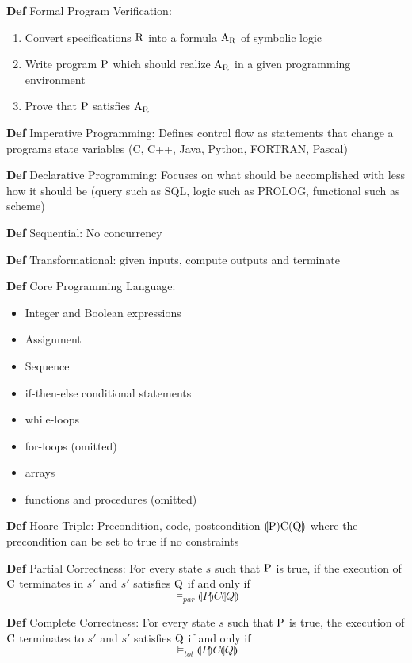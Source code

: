 \documentclass[11pt,notitlepage]{report}
\newcommand{\llp}[0]{\ensuremath{\llparenthesis}}
\newcommand{\rrp}[0]{\ensuremath{\rrparenthesis}}
\newcommand{\tbf}[1]{\textbf{#1}}
\begin{document}
\tbf{Def} Formal Program Verification:
\vspace{-3mm}
\begin{enumerate}
    \item Convert specifications $\rm R$ into a formula $\rm A_R$ of symbolic logic
    \item Write program $\rm P$ which should realize $\rm A_R$ in a given programming environment
    \item Prove that $\rm P$ satisfies $\rm A_R$
\end{enumerate}

\tbf{Def} Imperative Programming: Defines control flow as statements that change a programs state variables (C, C++, Java, Python, FORTRAN, Pascal)

\tbf{Def} Declarative Programming: Focuses on what should be accomplished with less how it should be (query such as SQL, logic such as PROLOG, functional such as scheme)

\tbf{Def} Sequential: No concurrency

\tbf{Def} Transformational: given inputs, compute outputs and terminate

\tbf{Def} Core Programming Language:
\vspace{-3mm}
\begin{itemize}
    \item Integer and Boolean expressions
    \item Assignment
    \item Sequence
    \item if-then-else conditional statements
    \item while-loops
    \item for-loops (omitted)
    \item arrays
    \item functions and procedures (omitted)
\end{itemize}

\tbf{Def} Hoare Triple: Precondition, code, postcondition $\rm \llp P\rrp C \llp Q\rrp$ where the precondition can be set to true if no constraints

\tbf{Def} Partial Correctness: For every state $s$ such that $\rm P$ is true, if the execution of $\rm C$ terminates in $s'$ and $s'$ satisfies $\rm Q$ if and only if
$$\vDash_{par} \llparenthesis P\rrparenthesis C \llp Q\rrp$$

\tbf{Def} Complete Correctness: For every state $s$ such that $\rm P$ is true, the execution of $\rm C$ terminates to $s'$ and $s'$ satisfies $\rm Q$ if and only if
$$\vDash_{tot} \llparenthesis P\rrparenthesis C \llp Q\rrp$$
\end{document}

